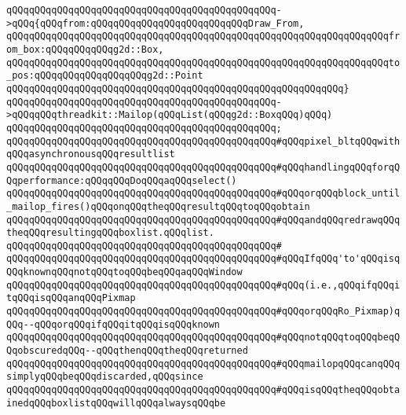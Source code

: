 \verb|qQQqqQQqqQQqqQQqqQQqqQQqqQQqqQQqqQQqqQQqqQQqqQQq->qQQq{qQQqfrom:qQQqqQQqqQQqqQQqqQQqqQQqqQQqDraw_From,|\newline
\verb|qQQqqQQqqQQqqQQqqQQqqQQqqQQqqQQqqQQqqQQqqQQqqQQqqQQqqQQqqQQqqQQqqQQqfrom_box:qQQqqQQqqQQqg2d::Box,|\newline
\verb|qQQqqQQqqQQqqQQqqQQqqQQqqQQqqQQqqQQqqQQqqQQqqQQqqQQqqQQqqQQqqQQqqQQqto_pos:qQQqqQQqqQQqqQQqqQQqg2d::Point|\newline
\verb|qQQqqQQqqQQqqQQqqQQqqQQqqQQqqQQqqQQqqQQqqQQqqQQqqQQqqQQqqQQq}|\newline
\verb|qQQqqQQqqQQqqQQqqQQqqQQqqQQqqQQqqQQqqQQqqQQqqQQq->qQQqqQQqthreadkit::Mailop(qQQqList(qQQqg2d::BoxqQQq)qQQq)|\newline
\verb|qQQqqQQqqQQqqQQqqQQqqQQqqQQqqQQqqQQqqQQqqQQqqQQq;|\newline
\verb|qQQqqQQqqQQqqQQqqQQqqQQqqQQqqQQqqQQqqQQqqQQqqQQq#qQQqpixel_bltqQQqwithqQQqasynchronousqQQqresultlist|\newline
\verb|qQQqqQQqqQQqqQQqqQQqqQQqqQQqqQQqqQQqqQQqqQQqqQQq#qQQqhandlingqQQqforqQQqperformance:qQQqqQQqDoqQQqaqQQqselect()|\newline
\verb|qQQqqQQqqQQqqQQqqQQqqQQqqQQqqQQqqQQqqQQqqQQqqQQq#qQQqorqQQqblock_until_mailop_fires()qQQqonqQQqtheqQQqresultqQQqtoqQQqobtain|\newline
\verb|qQQqqQQqqQQqqQQqqQQqqQQqqQQqqQQqqQQqqQQqqQQqqQQq#qQQqandqQQqredrawqQQqtheqQQqresultingqQQqboxlist.qQQqlist.|\newline
\verb|qQQqqQQqqQQqqQQqqQQqqQQqqQQqqQQqqQQqqQQqqQQqqQQq#|\newline
\verb|qQQqqQQqqQQqqQQqqQQqqQQqqQQqqQQqqQQqqQQqqQQqqQQq#qQQqIfqQQq'to'qQQqisqQQqknownqQQqnotqQQqtoqQQqbeqQQqaqQQqWindow|\newline
\verb|qQQqqQQqqQQqqQQqqQQqqQQqqQQqqQQqqQQqqQQqqQQqqQQq#qQQq(i.e.,qQQqifqQQqitqQQqisqQQqanqQQqPixmap|\newline
\verb|qQQqqQQqqQQqqQQqqQQqqQQqqQQqqQQqqQQqqQQqqQQqqQQq#qQQqorqQQqRo_Pixmap)qQQq--qQQqorqQQqifqQQqitqQQqisqQQqknown|\newline
\verb|qQQqqQQqqQQqqQQqqQQqqQQqqQQqqQQqqQQqqQQqqQQqqQQq#qQQqnotqQQqtoqQQqbeqQQqobscuredqQQq--qQQqthenqQQqtheqQQqreturned|\newline
\verb|qQQqqQQqqQQqqQQqqQQqqQQqqQQqqQQqqQQqqQQqqQQqqQQq#qQQqmailopqQQqcanqQQqsimplyqQQqbeqQQqdiscarded,qQQqsince|\newline
\verb|qQQqqQQqqQQqqQQqqQQqqQQqqQQqqQQqqQQqqQQqqQQqqQQq#qQQqisqQQqtheqQQqobtainedqQQqboxlistqQQqwillqQQqalwaysqQQqbe|\newline
